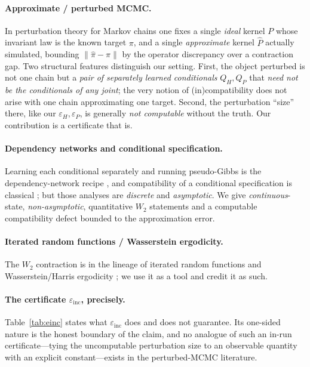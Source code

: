 \documentclass[11pt]{article}
\theoremstyle{plain}
\theoremstyle{definition}
\theoremstyle{remark}
\newcommand{\einc}{\varepsilon_{\mathrm{inc}}}
\begin{document}
\paragraph{Approximate / perturbed MCMC.}
In perturbation theory for Markov chains \citep{mitrophanov2005,rudolf2018,johndrow2015,medina2016,negrea2021}
one fixes a single \emph{ideal} kernel $P$ whose invariant law is the known target $\pi$, and a single
\emph{approximate} kernel $\hat P$ actually simulated, bounding $\|\hat\pi-\pi\|$ by the operator
discrepancy over a contraction gap. Two structural features distinguish our setting. First, the object
perturbed is not one chain but a \emph{pair of separately learned conditionals} $Q_H,Q_P$ that
\emph{need not be the conditionals of any joint}; the very notion of (in)compatibility does not arise
with one chain approximating one target. Second, the perturbation ``size'' there, like our
$\varepsilon_H,\varepsilon_P$, is generally \emph{not computable} without the truth. Our contribution is
a certificate that is.

\paragraph{Dependency networks and conditional specification.}
Learning each conditional separately and running pseudo-Gibbs is the dependency-network recipe
\citep{heckerman2000}, and compatibility of a conditional specification is classical
\citep{arnold1999}; but those analyses are \emph{discrete} and \emph{asymptotic}. We give
\emph{continuous}-state, \emph{non-asymptotic}, quantitative $W_2$ statements and a computable
compatibility defect bounded to the approximation error.

\paragraph{Iterated random functions / Wasserstein ergodicity.}
The $W_2$ contraction is in the lineage of iterated random functions \citep{diaconis1999} and
Wasserstein/Harris ergodicity \citep{hairer2011}; we use it as a tool and credit it as such.

\paragraph{The certificate $\einc$, precisely.}
Table~\ref{tab:einc} states what $\einc$ does and does not guarantee. Its one-sided nature is the
honest boundary of the claim, and no analogue of such an in-run certificate---tying the uncomputable
perturbation size to an observable quantity with an explicit constant---exists in the perturbed-MCMC
literature.
\end{document}
